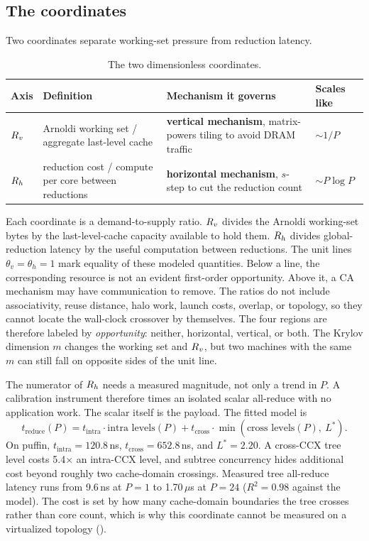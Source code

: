\subsection{The coordinates}\label{sec:coords}

Two coordinates separate working-set pressure from reduction latency.

\begin{table}[htbp!]
\centering
\caption{The two dimensionless coordinates.}
\label{tab:coords}
\begin{tabular}{@{}lp{5.2cm}p{4.6cm}l@{}}
\toprule
\textbf{Axis} & \textbf{Definition} & \textbf{Mechanism it governs} & \textbf{Scales like} \\
\midrule
$R_v$ & Arnoldi working set / aggregate last-level cache & \textbf{vertical mechanism}, matrix-powers tiling to avoid DRAM traffic & ${\sim}1/P$ \\
$R_h$ & reduction cost / compute per core between reductions & \textbf{horizontal mechanism}, $s$-step to cut the reduction count & ${\sim}P\log P$ \\
\bottomrule
\end{tabular}
\end{table}

Each coordinate is a demand-to-supply ratio. $R_v$ divides the Arnoldi working-set bytes by the last-level-cache capacity available to hold them. $R_h$ divides global-reduction latency by the useful computation between reductions. The unit lines $\theta_v=\theta_h=1$ mark equality of these modeled quantities. Below a line, the corresponding resource is not an evident first-order opportunity. Above it, a CA mechanism may have communication to remove. The ratios do not include associativity, reuse distance, halo work, launch costs, overlap, or topology, so they cannot locate the wall-clock crossover by themselves. The four regions are therefore labeled by \emph{opportunity}: neither, horizontal, vertical, or both. The Krylov dimension $m$ changes the working set and $R_v$, but two machines with the same $m$ can still fall on opposite sides of the unit line.

The numerator of $R_h$ needs a measured magnitude, not only a trend in $P$. A calibration instrument therefore times an isolated scalar all-reduce with no application work. The scalar itself is the payload. The fitted model is
\begin{equation}
t_{\text{reduce}}(P) = t_{\text{intra}} \cdot \text{intra levels}(P)
  + t_{\text{cross}} \cdot \min(\text{cross levels}(P),\ L^{*}).
\label{eq:treduce}
\end{equation}
On puffin, $t_{\text{intra}} = 120.8$\,ns, $t_{\text{cross}} = 652.8$\,ns, and $L^{*} = 2.20$. A cross-CCX tree level costs 5.4$\times$ an intra-CCX level, and subtree concurrency hides additional cost beyond roughly two cache-domain crossings. Measured tree all-reduce latency runs from 9.6\,ns at $P=1$ to 1.70\,$\mu$s at $P=24$ ($R^2 = 0.98$ against the model). The cost is set by how many cache-domain boundaries the tree crosses rather than core count, which is why this coordinate cannot be measured on a virtualized topology ().

